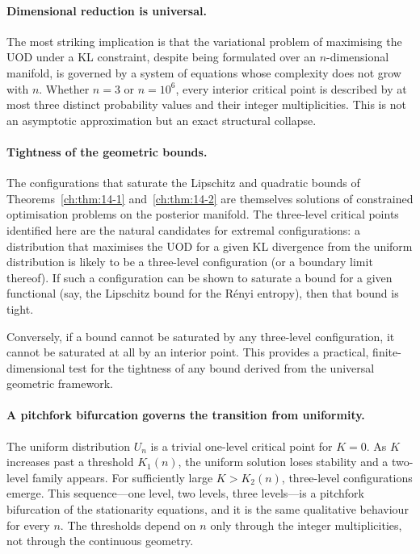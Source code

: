 \paragraph{Dimensional reduction is universal.}
The most striking implication is that the variational problem of
maximising the UOD under a KL constraint, despite being formulated over
an \(n\)-dimensional manifold, is governed by a system of equations
whose complexity does not grow with \(n\).  Whether \(n=3\) or
\(n=10^6\), every interior critical point is described by at most three
distinct probability values and their integer multiplicities.  This is
not an asymptotic approximation but an exact structural collapse.

\paragraph{Tightness of the geometric bounds.}
The configurations that saturate the Lipschitz and quadratic bounds of
Theorems~\ref{ch:thm:14-1} and~\ref{ch:thm:14-2} are themselves
solutions of constrained optimisation problems on the posterior
manifold.  The three-level critical points identified here are the
natural candidates for extremal configurations: a distribution that
maximises the UOD for a given KL divergence from the uniform
distribution is likely to be a three-level configuration (or a
boundary limit thereof).  If such a configuration can be shown to
saturate a bound for a given functional (say, the Lipschitz bound for
the R\'enyi entropy), then that bound is tight.

Conversely, if a bound cannot be saturated by any three-level
configuration, it cannot be saturated at all by an interior point.
This provides a practical, finite-dimensional test for the tightness of
any bound derived from the universal geometric framework.

\paragraph{A pitchfork bifurcation governs the transition from
uniformity.}
The uniform distribution \(U_n\) is a trivial one-level critical point
for \(K=0\).  As \(K\) increases past a threshold \(K_1(n)\), the
uniform solution loses stability and a two-level family appears.
For sufficiently large \(K>K_2(n)\), three-level configurations emerge.
This sequence---one level, two levels, three levels---is a
pitchfork bifurcation of the stationarity equations, and it is the same
qualitative behaviour for every \(n\).  The thresholds depend on \(n\)
only through the integer multiplicities, not through the continuous
geometry.

